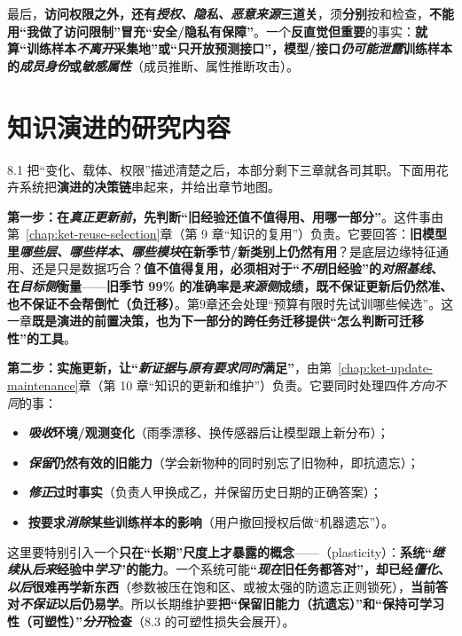 最后，\textbf{访问权限之外，还有\emph{授权、隐私、恶意来源}三道关}，须\textbf{分别}按和检查，\textbf{不能用“我做了访问限制”冒充“安全/隐私有保障”}。一个\textbf{反直觉但重要}的事实：\textbf{就算“训练样本\emph{不离开}采集地”或“只开放预测接口”，模型/接口\emph{仍可能泄露}训练样本的\emph{成员身份}或\emph{敏感属性}}（成员推断、属性推断攻击）。

\section{知识演进的研究内容}
\label{sec:ket-overview-research}

8.1 把“变化、载体、权限”描述清楚之后，本部分剩下三章就各司其职。下面用花卉系统把\textbf{演进的决策链}串起来，并给出章节地图。

\textbf{第一步：在\emph{真正更新前}，先判断“旧经验还值不值得用、用哪一部分”}。这件事由第~\ref{chap:ket-reuse-selection}章（第 9 章“知识的复用”）负责。它要回答：\textbf{旧模型里\emph{哪些层、哪些样本、哪些模块}在新季节/新类别上仍然有用}？是底层边缘特征通用、还是只是数据巧合？\textbf{值不值得复用，必须\textbf{相对于“\emph{不用}旧经验”的\emph{对照基线}}、在\emph{目标侧}衡量}——\textbf{旧季节 99\% 的准确率是\emph{来源侧}成绩，既不保证更新后仍然准、也不保证不会帮倒忙（负迁移）}。第9章还会处理“预算有限时先试训哪些候选”。这一章\textbf{既是演进的前置决策，也为下一部分的跨任务迁移提供“怎么判断可迁移性”的工具}。

\textbf{第二步：实施更新，让“\emph{新证据}与\emph{原有要求}\emph{同时}满足”}，由第~\ref{chap:ket-update-maintenance}章（第 10 章“知识的更新和维护”）负责。它要同时处理四件\emph{方向不同}的事：
\begin{itemize}\item \textbf{\emph{吸收}环境/观测变化}（雨季漂移、换传感器后让模型跟上新分布）；\item \textbf{\emph{保留}仍然有效的旧能力}（学会新物种的同时别忘了旧物种，即抗遗忘）；\item \textbf{\emph{修正}过时事实}（负责人甲换成乙，并保留历史日期的正确答案）；\item \textbf{按要求\emph{消除}某些训练样本的影响}（用户撤回授权后做“机器遗忘”）。\end{itemize}
这里要特别引入一个\textbf{只在“长期”尺度上才暴露的概念}——（plasticity）：\textbf{系统“\emph{继续}从\emph{后来}经验中\emph{学习}”的能力}。一个系统可能\textbf{“\emph{现在}旧任务都答对”，却已经\emph{僵化}、\emph{以后}很难再学新东西}（参数被压在饱和区、或被太强的防遗忘正则锁死），\textbf{当前答对\emph{不保证}以后仍易学}。所以长期维护要\textbf{把“保留旧能力（抗遗忘）”和“保持可学习性（可塑性）”\emph{分开}检查}（8.3 的可塑性损失会展开）。

